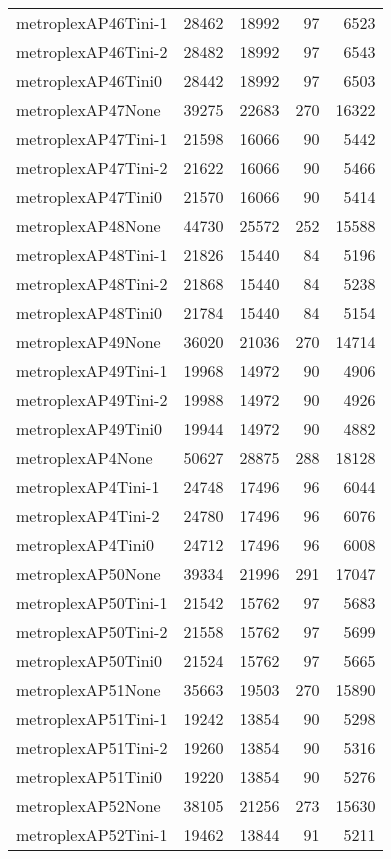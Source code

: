 \begin{longtable}{lrrrr}
metroplexAP46Tini-1 & 28462 & 18992 & 97 & 6523 \\
metroplexAP46Tini-2 & 28482 & 18992 & 97 & 6543 \\
metroplexAP46Tini0 & 28442 & 18992 & 97 & 6503 \\
metroplexAP47None & 39275 & 22683 & 270 & 16322 \\
metroplexAP47Tini-1 & 21598 & 16066 & 90 & 5442 \\
metroplexAP47Tini-2 & 21622 & 16066 & 90 & 5466 \\
metroplexAP47Tini0 & 21570 & 16066 & 90 & 5414 \\
metroplexAP48None & 44730 & 25572 & 252 & 15588 \\
metroplexAP48Tini-1 & 21826 & 15440 & 84 & 5196 \\
metroplexAP48Tini-2 & 21868 & 15440 & 84 & 5238 \\
metroplexAP48Tini0 & 21784 & 15440 & 84 & 5154 \\
metroplexAP49None & 36020 & 21036 & 270 & 14714 \\
metroplexAP49Tini-1 & 19968 & 14972 & 90 & 4906 \\
metroplexAP49Tini-2 & 19988 & 14972 & 90 & 4926 \\
metroplexAP49Tini0 & 19944 & 14972 & 90 & 4882 \\
metroplexAP4None & 50627 & 28875 & 288 & 18128 \\
metroplexAP4Tini-1 & 24748 & 17496 & 96 & 6044 \\
metroplexAP4Tini-2 & 24780 & 17496 & 96 & 6076 \\
metroplexAP4Tini0 & 24712 & 17496 & 96 & 6008 \\
metroplexAP50None & 39334 & 21996 & 291 & 17047 \\
metroplexAP50Tini-1 & 21542 & 15762 & 97 & 5683 \\
metroplexAP50Tini-2 & 21558 & 15762 & 97 & 5699 \\
metroplexAP50Tini0 & 21524 & 15762 & 97 & 5665 \\
metroplexAP51None & 35663 & 19503 & 270 & 15890 \\
metroplexAP51Tini-1 & 19242 & 13854 & 90 & 5298 \\
metroplexAP51Tini-2 & 19260 & 13854 & 90 & 5316 \\
metroplexAP51Tini0 & 19220 & 13854 & 90 & 5276 \\
metroplexAP52None & 38105 & 21256 & 273 & 15630 \\
metroplexAP52Tini-1 & 19462 & 13844 & 91 & 5211 \\

\end{longtable}
